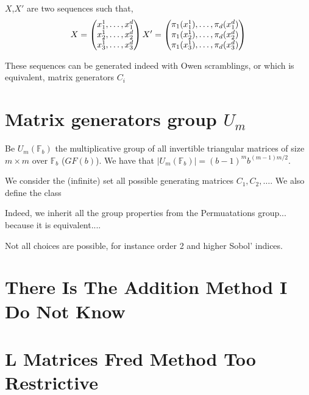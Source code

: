 \documentclass[]{elsarticle}
\theoremstyle{definition}
\def\abs#1{\ensuremath{\left \lvert #1 \right \rvert}}
\begin{document}
$X$,$X'$ are two sequences such that,
\[
X = \begin{pmatrix}
x_1^1,\dots,x_1^d \\
x_2^1,\dots,x_2^d \\
x_3^1,\dots,x_3^d \\
\end{pmatrix} \\
X' = \begin{pmatrix}
\pi_1(x_1^1),\dots,\pi_d(x_1^d) \\
\pi_1(x_2^1),\dots,\pi_d(x_2^d) \\
\pi_1(x_3^1),\dots,\pi_d(x_3^d) \\
\end{pmatrix}
\]

These sequences can be generated indeed with Owen scramblings, or which is equivalent, matrix generators $C_i$

\section{Matrix generators group $U_m$}

Be $U_m(\mathbb{F}_b)$ the multiplicative group of all invertible triangular matrices of size $m\times m$ over $\mathbb{F}_b$ ($GF(b)$). We have that $\abs{U_m(\mathbb{F}_b)}=(b-1)^m b^{(m-1)m/2}$.

We consider the (infinite) set all possible generating matrices $C_1,C_2,\dots$. We also define the class 

Indeed, we inherit all the group properties from the Permuatations group... because it is equivalent....

Not all choices are possible, for instance order 2 and higher Sobol' indices.


\section{There Is The Addition Method I Do Not Know}



\section{L Matrices Fred Method Too Restrictive}
\end{document}
